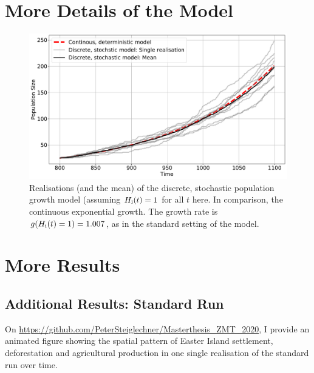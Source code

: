 
\chapter{More Details of the Model} \label{sec:APPpopgrowth}
\FloatBarrier
\begin{figure}[h]
	\centering
	\includegraphics[width=\textwidth]{images/RealisationsOfPopGrowth.pdf}
	\caption{Realisations (and the mean) of the discrete, stochastic population growth model (assuming $H_{\rm i}(t) = 1$ for all $t$ here. In comparison, the continuous exponential growth. The growth rate is $g(H_{\rm i}(t)=1)=1.007$, as in the standard setting of the model.}
	\label{fig:realisationsofpopgrowth}
\end{figure}


\chapter{More Results}
\FloatBarrier
\section{Additional Results: Standard Run}
On \url{https://github.com/PeterSteiglechner/Masterthesis_ZMT_2020}, I provide an animated figure showing the spatial pattern of Easter Island settlement, deforestation and agricultural production in one single realisation of the standard run over time.

